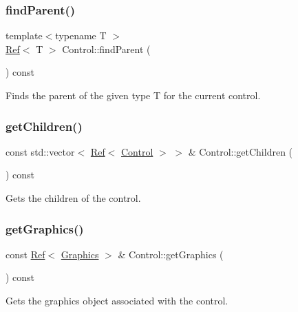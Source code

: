 \subsubsection{\texorpdfstring{findParent()}{findParent()}}
{\footnotesize\ttfamily template$<$typename T $>$ \\
\mbox{\hyperlink{class_ref}{Ref}}$<$ T $>$ Control\+::find\+Parent (\begin{DoxyParamCaption}{ }\end{DoxyParamCaption}) const\hspace{0.3cm}{\ttfamily [inline]}}



Finds the parent of the given type T for the current control. 

\mbox{\label{class_control_a75bb00f2b4c535741bbc5a70b75ffb82}} 
\subsubsection{\texorpdfstring{getChildren()}{getChildren()}}
{\footnotesize\ttfamily const std\+::vector$<$ \mbox{\hyperlink{class_ref}{Ref}}$<$ \mbox{\hyperlink{class_control}{Control}} $>$ $>$ \& Control\+::get\+Children (\begin{DoxyParamCaption}{ }\end{DoxyParamCaption}) const}



Gets the children of the control. 

\mbox{\label{class_control_a9016bc607e76e382899be459e7d142ca}} 
\subsubsection{\texorpdfstring{getGraphics()}{getGraphics()}}
{\footnotesize\ttfamily const \mbox{\hyperlink{class_ref}{Ref}}$<$ \mbox{\hyperlink{class_graphics}{Graphics}} $>$ \& Control\+::get\+Graphics (\begin{DoxyParamCaption}{ }\end{DoxyParamCaption}) const}



Gets the graphics object associated with the control. 

